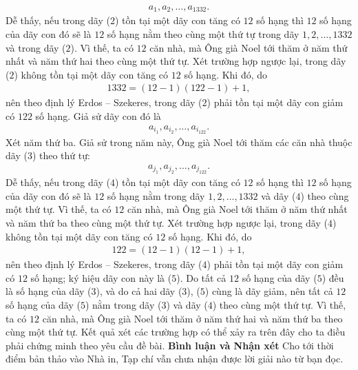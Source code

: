 \begin{multicols}{2}
	\begin{align*}
		{a_1},{a_2}, \ldots ,{a_{1332}}. \tag{$2$}
	\end{align*}
	Dễ thấy, nếu trong dãy ($2$) tồn tại một dãy con tăng có $12$ số hạng thì $12$ số hạng của dãy con đó sẽ là $12$ số hạng nằm theo cùng một thứ tự trong dãy $1, 2, \ldots, 1332$ và trong dãy ($2$). Vì thế, ta có $12$ căn nhà, mà Ông già Noel tới thăm ở năm thứ nhất và năm thứ hai theo cùng một thứ tự.
	\vskip 0.01cm
	Xét trường hợp ngược lại, trong dãy ($2$) không tồn tại một dãy con tăng có $12$ số hạng.
	\vskip 0.01cm
	Khi đó, do
	\begin{align*}
		1332 = (12 - 1)(122 - 1) + 1,
	\end{align*}
	nên theo định lý Erdos -- Szekeres, trong dãy ($2$) phải tồn tại một dãy con giảm có $122$ số hạng. Giả sử dãy con đó là
	\begin{align*}
		{a_{{i_1}}},{a_{{i_2}}}, \ldots ,{a_{{i_{122}}}}. \tag{$3$}
	\end{align*}
	Xét năm thứ ba. Giả sử trong năm này, Ông già Noel tới thăm các căn nhà thuộc dãy ($3$) theo thứ tự:
	\begin{align*}
		{a_{{j_1}}},{a_{{j_2}}}, \ldots ,{a_{{j_{122}}}}. \tag{$4$}
	\end{align*}
	Dễ thấy, nếu trong dãy ($4$) tồn tại một dãy con tăng có $12$ số hạng thì $12$ số hạng của dãy con đó sẽ là $12$ số hạng nằm trong dãy $1, 2, \ldots, 1332$ và dãy ($4$) theo cùng một thứ tự. Vì thế, ta có $12$ căn nhà, mà Ông già Noel tới thăm ở năm thứ nhất và năm thứ ba theo cùng một thứ tự.
	\vskip 0.05cm
	Xét trường hợp ngược lại, trong dãy ($4$) không tồn tại một dãy con tăng có $12$ số hạng.
	\vskip 0.05cm
	Khi đó, do
	\begin{align*}
		122 = (12 - 1)(12 - 1) + 1,
	\end{align*}
	nên theo định lý Erdos -- Szekeres, trong dãy ($4$) phải tồn tại một dãy con giảm có $12$ số hạng; ký hiệu dãy con này là ($5$).
	\vskip 0.05cm
	Do tất cả $12$ số hạng của dãy ($5$) đều là số hạng của dãy ($3$), và do cả hai dãy ($3$), ($5$) cùng là dãy giảm, nên tất cả $12$ số hạng của dãy ($5$) nằm trong dãy ($3$) và dãy ($4$) theo cùng một thứ tự. Vì thế, ta có $12$ căn nhà, mà Ông già Noel tới thăm ở năm thứ hai và năm thứ ba theo cùng một thứ tự.
	\vskip 0.05cm
	Kết quả xét các trường hợp có thể xảy ra trên đây cho ta điều phải chứng minh theo yêu cầu đề bài.
	\vskip 0.05cm
	\textbf{\color{thachthuctoanhoc}Bình luận và Nhận xét}
	\vskip 0.05cm
	Cho tới thời điểm bản thảo vào Nhà in, Tạp chí vẫn chưa nhận được lời giải nào từ bạn đọc.

\end{multicols}
